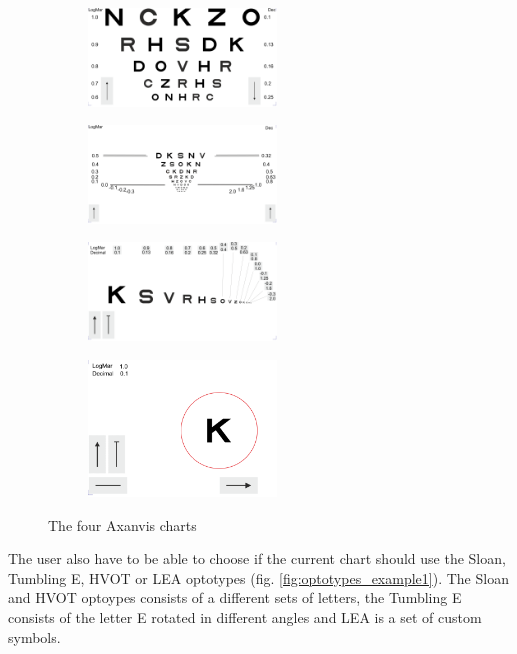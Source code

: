 \documentclass[12pt,a4paper,notitlepage]{report}
\begin{document}
\begin{figure}[ht!]
\centering
\begin{subfigure}{.5\textwidth}
  \centering
  \includegraphics[width=50mm]{images/etdrs_top.png}
  \label{fig:etdrs_upper1}
\end{subfigure}%
\begin{subfigure}{.5\textwidth}
  \centering
  \includegraphics[width=50mm]{images/etdrs_bottom.png}
  \label{fig:etdrs_lower1}
\end{subfigure}
\begin{subfigure}{.4\textwidth}
	\centering
	\includegraphics[width=50mm]{images/etdrs_one_line.png}
\end{subfigure}
\begin{subfigure}{.4\textwidth}
	\centering
	\includegraphics[width=50mm]{images/etdrs_single.png}
\end{subfigure}
\caption{The four Axanvis charts}
\label{fig:axanivis}
\end{figure}


The user also have to be able to choose if the current chart should use the Sloan, Tumbling E, HVOT or LEA optotypes (fig. \ref{fig:optotypes_example1}). The Sloan and HVOT optoypes consists of a different sets of letters, the Tumbling E consists of the letter E rotated in different angles and LEA is a set of custom symbols. \cite{Colenbrander}
\end{document}
